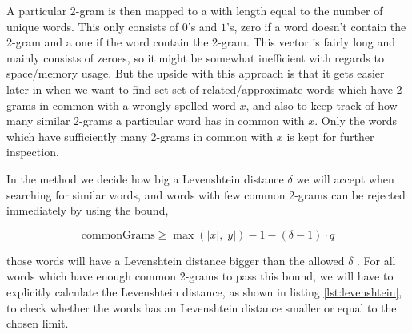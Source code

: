 A particular 2-gram is then mapped to a  with length equal to the number of unique words. This  only consists of \(0\)'s and \(1\)'s, zero if a word doesn't contain the 2-gram and a one if the word contain the 2-gram.
This vector is fairly long and mainly consists of zeroes, so it might be somewhat inefficient with regards to space/memory usage. 
But the upside with this approach is that it gets easier later in  when we want to find set set of related/approximate words which have 2-grams in common with a wrongly spelled word \(x\), and also to keep track of how many similar 2-grams a particular word has in common with \(x\). Only the words which have sufficiently many 2-grams in common with \(x\) is kept for further inspection. 

In the  method we decide how big a Levenshtein distance \(\delta\) we will accept when searching for similar words, and words with few common 2-grams can be rejected immediately by using the bound,

\[ \text{commonGrams} \geq \max{(|x|, |y|) - 1 - (\delta -1 ) \cdot q } \]   

those words will have a Levenshtein distance bigger than the allowed \(\delta\) \cite{lectureNotes}.  
For all words which have enough common 2-grams to pass this bound, we will have to explicitly calculate the Levenshtein distance, as shown in listing \ref{lst:levenshtein}, to check whether the words has an Levenshtein distance smaller or equal to the chosen limit. 


